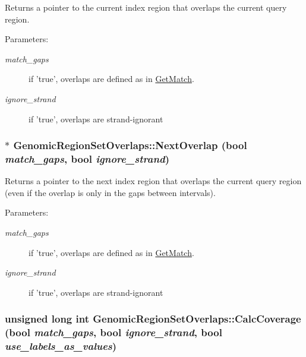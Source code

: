 Returns a pointer to the current index region that overlaps the current query region. 

\begin{Desc}
\item[Parameters:]
\begin{description}
\item[{\em match\_\-gaps}]if 'true', overlaps are defined as in \hyperlink{classGenomicRegionSetOverlaps_e6d1c3bd67b0a902649aab01909a9c10}{GetMatch}. \item[{\em ignore\_\-strand}]if 'true', overlaps are strand-ignorant \end{description}
\end{Desc}
\hypertarget{classGenomicRegionSetOverlaps_2fa112eab38f07e7bc75ac76f5b9fc67}{
\subsubsection[NextOverlap]{ $\ast$ GenomicRegionSetOverlaps::NextOverlap (bool {\em match\_\-gaps}, \/  bool {\em ignore\_\-strand})}}
\label{classGenomicRegionSetOverlaps_2fa112eab38f07e7bc75ac76f5b9fc67}


Returns a pointer to the next index region that overlaps the current query region (even if the overlap is only in the gaps between intervals). 

\begin{Desc}
\item[Parameters:]
\begin{description}
\item[{\em match\_\-gaps}]if 'true', overlaps are defined as in \hyperlink{classGenomicRegionSetOverlaps_e6d1c3bd67b0a902649aab01909a9c10}{GetMatch}. \item[{\em ignore\_\-strand}]if 'true', overlaps are strand-ignorant \end{description}
\end{Desc}
\hypertarget{classGenomicRegionSetOverlaps_309e9d296621aa80f1d13cdbd63d0aa4}{
\subsubsection[CalcCoverage]{\setlength{\rightskip}{0pt plus 5cm}unsigned long int GenomicRegionSetOverlaps::CalcCoverage (bool {\em match\_\-gaps}, \/  bool {\em ignore\_\-strand}, \/  bool {\em use\_\-labels\_\-as\_\-values})}}
\label{classGenomicRegionSetOverlaps_309e9d296621aa80f1d13cdbd63d0aa4}


